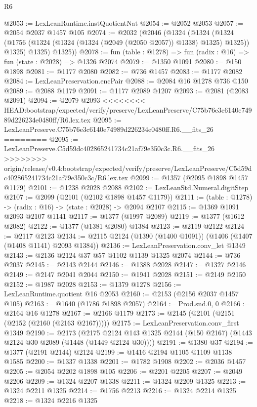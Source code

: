\begin{lexlean}{R6}
\begin{coremodule}
{{{{{{{{{{{{{{{{{{{{{{{{{{{{{{{{{{{{{{{{{{{{{{{{{{@2053 := LexLeanRuntime.instQuotientNat
@2054 := @2052 @2053
@2057 := @2054 @2037 @1457 @105
@2074 := @2032
    (@2046
      (@1324
        (@1324
          (@1324 (@1756 (@1324 (@1324 (@1324 (@2049 (@2050 @2057)) @1338) @1325) @1325)) @1325)
          @1325)
        @1325))
@2078 := fun (table : @1278) => fun (radix : @16) => fun (state : @2028) => @1326 @2074
@2079 := @1350 @1091
@2080 := @150 @1898
@2081 := @1177 @2080
@2082 := @736 @1457
@2083 := @1177 @2082
@2084 := LexLeanPreservation.encPair
@2088 := @2084 @16 @1278 @736 @150
@2089 := @2088 @1179
@2091 := @1177 @2089 @1207
@2093 := @2081 (@2083 @2091)
@2094 := @2079 @2093
<<<<<<<< HEAD:bootstrap/expected/verify/preserve/LexLeanPreserve/C75b76e3c6140e74989d226234e0480ff/R6.lex.tex
@2095 := LexLeanPreserve.C75b76e3c6140e74989d226234e0480ff.R6.__fits_26
========
@2095 := LexLeanPreserve.C5d59dc402865241734c21af79e350c3c.R6.__fits_26
>>>>>>>> origin/release/v0.4:bootstrap/expected/verify/preserve/LexLeanPreserve/C5d59dc402865241734c21af79e350c3c/R6.lex.tex
@2099 := @1357 (@2095 @1898 @1457 @1179)
@2101 := @1238 @2028 @2088
@2102 := LexLeanStd.Numeral.digitStep
@2107 := @2099 (@2101 (@2102 @1898 @1457 @1179))
@2111 := (table : @1278) -> (radix : @16) -> (state : @2028) -> @2094 @2107
@2115 := @1369 @1091 @2093 @2107 @1141
@2117 := @1377 (@1997 @2089)
@2119 := @1377 (@1612 @2082)
@2122 := @1377 (@1381 @2080) @1384
@2123 := @2119 @2122
@2124 := @2117 @2123
@2134 := @2115 @2124 (@1390 (@1400 @1091)) (@1406 (@1407 (@1408 @1141) @2093 @1384))
@2136 := LexLeanPreservation.conv_let @1349
@2143 := @2136 @2124 @37 @57 @1102 @1139 @1325 @2074
@2144 := @736 @2037
@2145 := @2143 @2144
@2146 := @1388 @2028
@2147 := @1327 @2146
@2149 := @2147 @2041 @2044
@2150 := @1941 @2028
@2151 := @2149 @2150
@2152 := @1987 @2028
@2153 := @1379 @1278
@2156 := LexLeanRuntime.quotient @16 @2053
@2160 := @2153 (@2156 @2037 @1457 @105)
@2163 := @1640 (@1786 @1898 @2057)
@2164 := Prod.snd.{0, 0}
@2166 := @2164 @16 @1278
@2167 := @2166 @1179
@2173 := @2145 (@2101 (@2151 (@2152 (@2160 (@2163 @2167)))))
@2175 := LexLeanPreservation.conv_first @1349
@2190 := @2173
    (@2175 @2124 @143 @1325 @2144 (@150 @2167) (@1443 @2124 @30 @2089 (@1448 (@1449 @2124 @30))))
@2191 := @1380 @37
@2194 := @1377 (@2191 @2144) @2124
@2199 := @1416 @2194 @1105 @1109 @1138 @1585
@2200 := @1337 @1338
@2201 := @1782 @1908
@2202 := @2036 @1457
@2205 := @2054 @2202 @1898 @105
@2206 := @2201 @2205
@2207 := @2049 @2206
@2209 := @1324 @2207 @1338
@2211 := @1324 @2209 @1325
@2213 := @1324 @2211 @1325
@2214 := @1756 @2213
@2216 := @1324 @2214 @1325
@2218 := @1324 @2216 @1325
}}}}}}}}}}}}}}}}}}}}}}}}}}}}}}}}}}}}}}}}}}}}}}}}}}
\end{coremodule}
\end{lexlean}

